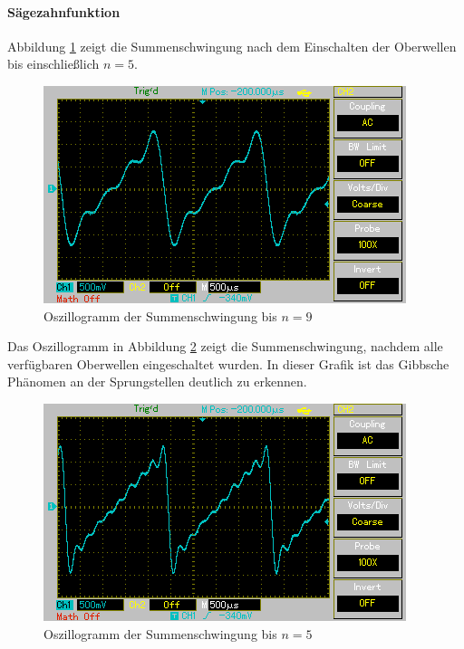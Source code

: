 \documentclass[11pt,ngerman,a4paper]{article}
\begin{document}
\paragraph{S\"agezahnfunktion}
Abbildung \ref{saw_1} zeigt die Summenschwingung nach dem Einschalten der Oberwellen bis einschlie\ss lich $ n = 5$. 
\begin{figure}[htp]
\centering
\includegraphics[scale=0.8]{Screenshots/saw_1.png}
\caption{Oszillogramm  der Summenschwingung bis $n = 9$}
\label{saw_1}
\end{figure}
Das Oszillogramm in Abbildung \ref{saw_2} zeigt die Summenschwingung, nachdem alle verf\"ugbaren Oberwellen eingeschaltet wurden. In dieser Grafik ist das Gibbsche Phänomen an der Sprungstellen deutlich zu erkennen.
\begin{figure}[htp]
\centering
\includegraphics[scale=0.8]{Screenshots/saw_2.png}
\caption{Oszillogramm  der Summenschwingung bis $n = 5$}
\label{saw_2}
\end{figure}
\end{document}
